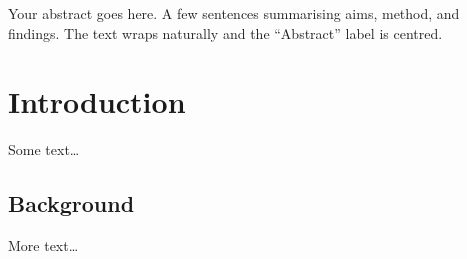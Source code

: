 \documentclass{SEEELab_V1}
\begin{document}

\begin{SEEEAbstract}
Your abstract goes here. A few sentences summarising aims, method, and
findings. The text wraps naturally and the “Abstract” label is centred.
\end{SEEEAbstract}

\tableofcontents

\section{Introduction}
Some text…

\subsection{Background}
More text…
\end{document}
